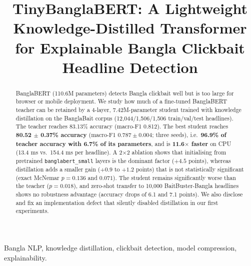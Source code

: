 \documentclass[conference]{IEEEtran}
\begin{document}
\title{TinyBanglaBERT: A Lightweight Knowledge-Distilled Transformer for Explainable Bangla Clickbait Headline Detection}

\author{
}

\maketitle

\begin{abstract}
BanglaBERT (110.6M parameters) detects Bangla clickbait well but is too large for browser or mobile deployment. We study how much of a fine-tuned BanglaBERT teacher can be retained by a 4-layer, 7.42M-parameter student trained with knowledge distillation on the BanglaBait corpus (12,044/1,506/1,506 train/val/test headlines). The teacher reaches 83.13\% accuracy (macro-F1 0.812). The best student reaches \textbf{80.52 $\pm$ 0.37\% accuracy} (macro-F1 $0.787 \pm 0.004$; three seeds), i.e.\ \textbf{96.9\% of teacher accuracy with 6.7\% of its parameters}, and is \textbf{11.6$\times$ faster} on CPU (13.4 ms vs.\ 154.4 ms per headline). A 2$\times$2 ablation shows that initialising from pretrained \texttt{banglabert\_small} layers is the dominant factor ($+4.5$ points), whereas distillation adds a smaller gain ($+0.9$ to $+1.2$ points) that is not statistically significant (exact McNemar $p=0.136$ and $0.071$). The student remains significantly worse than the teacher ($p=0.018$), and zero-shot transfer to 10,000 BaitBuster-Bangla headlines shows no robustness advantage (accuracy drops of 6.1 and 7.1 points). We also disclose and fix an implementation defect that silently disabled distillation in our first experiments.
\end{abstract}

\begin{IEEEkeywords}
Bangla NLP, knowledge distillation, clickbait detection, model compression, explainability.
\end{IEEEkeywords}
\end{document}
